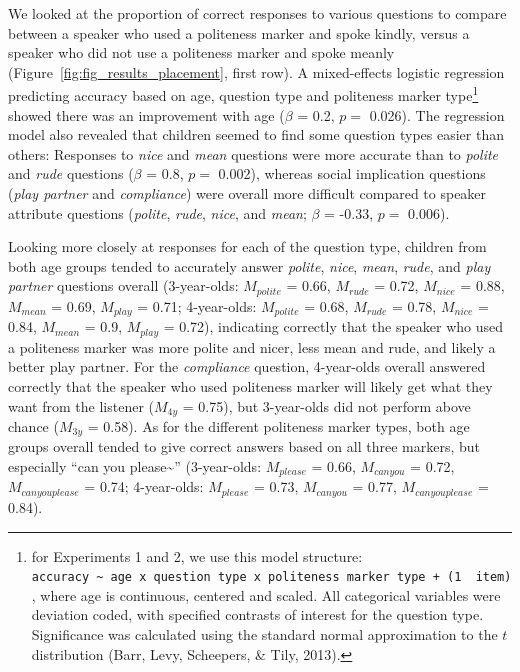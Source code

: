 \documentclass[10pt, letterpaper]{article}
\begin{document}
We looked at the proportion of correct responses to various questions to
compare between a speaker who used a politeness marker and spoke kindly,
versus a speaker who did not use a politeness marker and spoke meanly
(Figure~\ref{fig:fig_results_placement}, first row). A mixed-effects
logistic regression predicting accuracy based on age, question type and
politeness marker type\footnote{for Experiments 1 and 2, we use this
  model structure:
  \texttt{accuracy\ \textasciitilde{}\ age\ x\ question\ type\ x\ politeness\ marker\ type\ +\ (1\ \textbar{}\ item)},
  where age is continuous, centered and scaled. All categorical
  variables were deviation coded, with specified contrasts of interest
  for the question type. Significance was calculated using the standard
  normal approximation to the \(t\) distribution (Barr, Levy, Scheepers,
  \& Tily, 2013).} showed there was an improvement with age (\(\beta\) =
0.2, \(p =\) 0.026). The regression model also revealed that children
seemed to find some question types easier than others: Responses to
\emph{nice} and \emph{mean} questions were more accurate than to
\emph{polite} and \emph{rude} questions (\(\beta\) = 0.8, \(p =\)
0.002), whereas social implication questions (\emph{play partner} and
\emph{compliance}) were overall more difficult compared to speaker
attribute questions (\emph{polite}, \emph{rude}, \emph{nice}, and
\emph{mean}; \(\beta\) = -0.33, \(p =\) 0.006).

Looking more closely at responses for each of the question type,
children from both age groups tended to accurately answer \emph{polite},
\emph{nice}, \emph{mean}, \emph{rude}, and \emph{play partner} questions
overall (3-year-olds: \(M_{polite}\) = 0.66, \(M_{rude}\) = 0.72,
\(M_{nice}\) = 0.88, \(M_{mean}\) = 0.69, \(M_{play}\) = 0.71;
4-year-olds: \(M_{polite}\) = 0.68, \(M_{rude}\) = 0.78, \(M_{nice}\) =
0.84, \(M_{mean}\) = 0.9, \(M_{play}\) = 0.72), indicating correctly
that the speaker who used a politeness marker was more polite and nicer,
less mean and rude, and likely a better play partner. For the
\emph{compliance} question, 4-year-olds overall answered correctly that
the speaker who used politeness marker will likely get what they want
from the listener (\(M_{4y}\) = 0.75), but 3-year-olds did not perform
above chance (\(M_{3y}\) = 0.58). As for the different politeness marker
types, both age groups overall tended to give correct answers based on
all three markers, but especially ``can you please\textasciitilde{}''
(3-year-olds: \(M_{please}\) = 0.66, \(M_{can you}\) = 0.72,
\(M_{can you please}\) = 0.74; 4-year-olds: \(M_{please}\) = 0.73,
\(M_{can you}\) = 0.77, \(M_{can you please}\) = 0.84).
\end{document}
